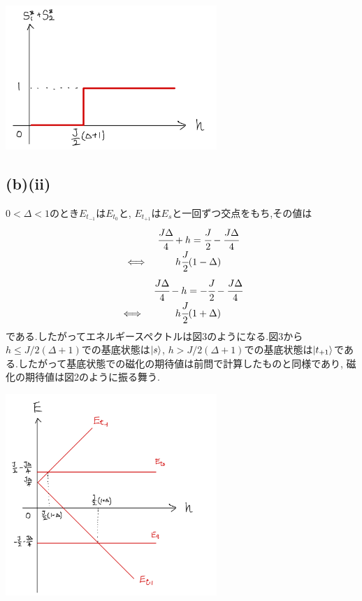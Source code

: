\documentclass[uplatex,a4j,11pt,dvipdfmx]{jsarticle}
\makeatletter
\def\fgcaption{\def\@captype{figure}\caption}
\makeatother
\begin{document}
\begin{center}
  \includegraphics[width=8cm]{mspec_dgeq0.png}
  \fgcaption{$\Delta\geq1$の場合の磁化の期待値}
\end{center}
\subsection*{(b)(ii)}
$0<\Delta<1$のとき$E_{t_{-1}}$は$E_{t_0}$と, $E_{t_{+1}}$は$E_s$と一回ずつ交点をもち,その値は
\begin{align}
  \begin{array}{cc}
    &\cfrac{J\Delta}{4}+h=\cfrac{J}{2}-\cfrac{J\Delta}{4}\\
    \iff&h\cfrac{J}{2}(1-\Delta)
  \end{array}
\end{align}
\begin{align}
  \begin{array}{cc}
    &\cfrac{J\Delta}{4}-h=-\cfrac{J}{2}-\cfrac{J\Delta}{4}\\
    \iff&h\cfrac{J}{2}(1+\Delta)
  \end{array}
\end{align}
である.したがってエネルギースペクトルは図3のようになる.図3から$h\leq J/2(\Delta+1)$での基底状態は$\Ket{s}$,
$h>J/2(\Delta+1)$での基底状態は$\Ket{t_{+1}}$である.したがって基底状態での磁化の期待値は前問で計算したものと同様であり,
磁化の期待値は図2のように振る舞う.
\begin{center}
  \includegraphics[width=8cm]{espec_dleq1.png}
  \fgcaption{$\Delta<1$の場合のエネルギースペクトル}
\end{center}
\end{document}
